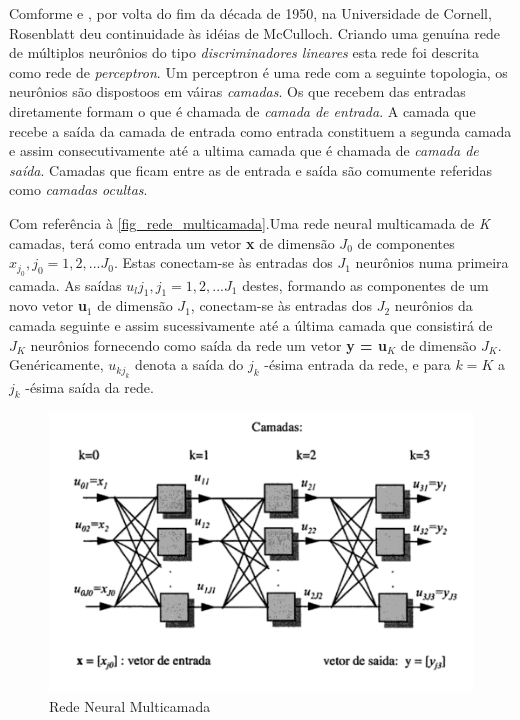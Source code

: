 \documentclass[
	12pt,				%
	openright,			%
	twoside,			%
	a4paper,			%
	english,			%
	french,				%
	spanish,			%
	brazil				%
	]{abntex2}
\begin{document}
Comforme  e , por volta do fim da década de 1950, na Universidade de Cornell, Rosenblatt deu continuidade às idéias de McCulloch. Criando uma genuína rede de múltiplos neurônios do tipo \emph{discriminadores lineares} esta rede foi descrita como rede de \emph{perceptron}. Um perceptron é uma rede com a seguinte topologia, os neurônios são dispostoos em váiras \emph{camadas}. Os que recebem das entradas diretamente formam o que é chamada de \emph{camada de entrada}. A camada que recebe a saída da camada de entrada como entrada constituem a segunda camada e assim consecutivamente até a ultima camada que é chamada de \emph{camada de saída}. Camadas que ficam entre as de entrada e saída são comumente referidas como \emph{camadas ocultas}.

Com referência à \autoref{fig_rede_multicamada}.Uma rede neural multicamada de \emph{K} camadas, terá como entrada um vetor \textbf{x} de dimensão $J_0$ de componentes $x_{j_0}, j_0 = 1,2, ... J_0$. Estas conectam-se às entradas dos $J_1$ neurônios numa primeira camada. As saídas $u_lj_1,j_1 = 1,2, ... J_1$ destes, formando as componentes de um novo vetor \textbf{u$_1$} de dimensão $J_1$, conectam-se às entradas dos $J_2$ neurônios da camada seguinte e assim sucessivamente até a última camada que consistirá de $J_K$ neurônios fornecendo como saída da rede um vetor \textbf{y = u$_K$} de dimensão $J_K$. Genéricamente, $u_{kj_k}$ denota a saída do $j_k$ -ésima entrada da rede, e para $k=K$ a $j_k$ -ésima saída da rede.\cite[p. 39--40]{kovacs2002redes}

\begin{figure}[htb]
	\caption{\label{fig_rede_multicamada}Rede Neural Multicamada}
	\begin{center}
	    \includegraphics[scale=0.7]{imagens/rede_neural_multicamada.pdf}
	\end{center}
\end{figure}
\end{document}
